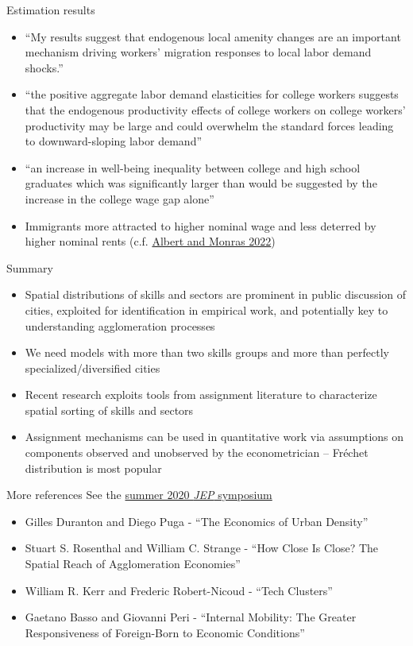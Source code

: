 \documentclass[10pt,notes=hide]{beamer}
\begin{document}
\begin{frame}{Estimation results}
\begin{itemize}
	\item ``My results suggest that endogenous local amenity changes are an important mechanism driving workers' migration responses to local labor demand shocks.''
	\item ``the positive aggregate labor demand elasticities for college workers suggests that the endogenous productivity effects of college workers on college workers' productivity may be large and could overwhelm the standard forces leading to downward-sloping labor demand''
	\item ``an increase in well-being inequality between college and high school graduates which was significantly larger than would be suggested by the increase in the college wage gap alone''
	\item Immigrants more attracted to higher nominal wage and less deterred by higher nominal rents (c.f. \href{https://www.aeaweb.org/articles?id=10.1257/aer.20211241}{Albert and Monras 2022})
\end{itemize}
\end{frame}
\begin{frame}{Summary}
\begin{itemize}
	\item Spatial distributions of skills and sectors are prominent in public discussion of cities, exploited for identification in empirical work, and potentially key to understanding agglomeration processes
	\item We need models with more than two skills groups and more than perfectly specialized/diversified cities
	\item Recent research exploits tools from assignment literature to characterize spatial sorting of skills and sectors
	\item Assignment mechanisms can be used in quantitative work via assumptions on components observed and unobserved by the econometrician -- Fr\'{e}chet distribution is most popular
\end{itemize}
\end{frame}
\begin{frame}{More references}
See the \href{https://www.aeaweb.org/issues/602}{summer 2020 \textit{JEP} symposium}
\begin{itemize}
\item Gilles Duranton and Diego Puga - ``The Economics of Urban Density''
\item Stuart S. Rosenthal and William C. Strange - ``How Close Is Close? The Spatial Reach of Agglomeration Economies''
\item William R. Kerr and Frederic Robert-Nicoud - ``Tech Clusters''
\item Gaetano Basso and Giovanni Peri - ``Internal Mobility: The Greater Responsiveness of Foreign-Born to Economic Conditions''
\end{itemize}
\end{frame}
\end{document}
